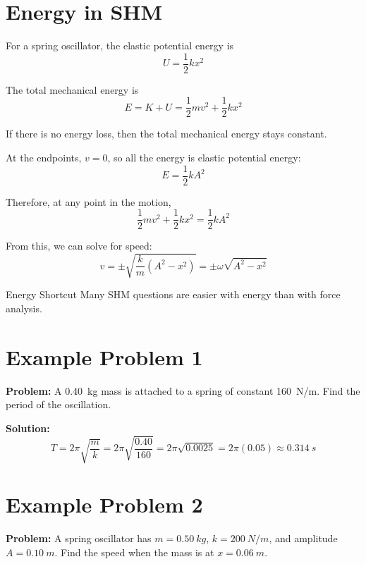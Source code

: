 \section{Energy in SHM}
For a spring oscillator, the elastic potential energy is
\begin{equation}
    U = \frac{1}{2}kx^2
\end{equation}

The total mechanical energy is
\begin{equation}
    E = K + U = \frac{1}{2}mv^2 + \frac{1}{2}kx^2
\end{equation}

If there is no energy loss, then the total mechanical energy stays constant.

At the endpoints, $v=0$, so all the energy is elastic potential energy:
\begin{equation}
    E = \frac{1}{2}kA^2
\end{equation}

Therefore, at any point in the motion,
\begin{equation}
    \frac{1}{2}mv^2 + \frac{1}{2}kx^2 = \frac{1}{2}kA^2
\end{equation}

From this, we can solve for speed:
\begin{equation}
    v = \pm \sqrt{\frac{k}{m}(A^2-x^2)}
    = \pm \omega\sqrt{A^2-x^2}
\end{equation}

\begin{keyidea}{Energy Shortcut}
Many SHM questions are easier with energy than with force analysis.
\end{keyidea}

\section{Example Problem 1}
\textbf{Problem:} A \SI{0.40}{kg} mass is attached to a spring of constant \SI{160}{N/m}. Find the period of the oscillation.

\textbf{Solution:}
\begin{equation}
    T = 2\pi\sqrt{\frac{m}{k}}
      = 2\pi\sqrt{\frac{0.40}{160}}
      = 2\pi\sqrt{0.0025}
      = 2\pi(0.05)
      \approx \SI{0.314}{s}
\end{equation}

\section{Example Problem 2}
\textbf{Problem:} A spring oscillator has $m=\SI{0.50}{kg}$, $k=\SI{200}{N/m}$, and amplitude $A=\SI{0.10}{m}$. Find the speed when the mass is at $x=\SI{0.06}{m}$.

